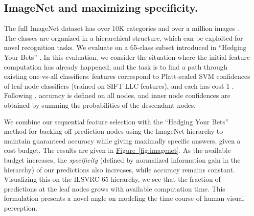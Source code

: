 \subsection{ImageNet and maximizing specificity.}
The full ImageNet dataset has over 10K categories and over a million images \parencite{Deng-ECCV-2010}.
The classes are organized in a hierarchical structure, which can be exploited for novel recognition tasks.
We evaluate on a 65-class subset introduced in ``Hedging Your Bets'' \parencite{Deng-CVPR-2012}.
In this evaluation, we consider the situation where the initial feature computation has already happened, and the task is to find a path through existing one-vs-all classifiers: features correspond to Platt-scaled SVM confidences of leaf-node classifiers (trained on SIFT-LLC features), and each has cost 1 \parencite{Deng-ECCV-2010}.
Following \parencite{Deng-CVPR-2012}, accuracy is defined on all nodes, and inner node confidences are obtained by summing the probabilities of the descendant nodes.

We combine our sequential feature selection with the ``Hedging Your Bets'' method for backing off prediction nodes using the ImageNet hierarchy to maintain guaranteed accuracy while giving maximally specific answers, given a cost budget.
The results are given in \hyperref[fig:imagenet]{Figure~\ref*{fig:imagenet}}.
As the available budget increases, the \emph{specificity} (defined by normalized information gain in the hierarchy) of our predictions also increases, while accuracy remains constant.
Visualizing this on the ILSVRC-65 hierarchy, we see that the fraction of predictions at the leaf nodes grows with available computation time.
This formulation presents a novel angle on modeling the time course of human visual perception.

